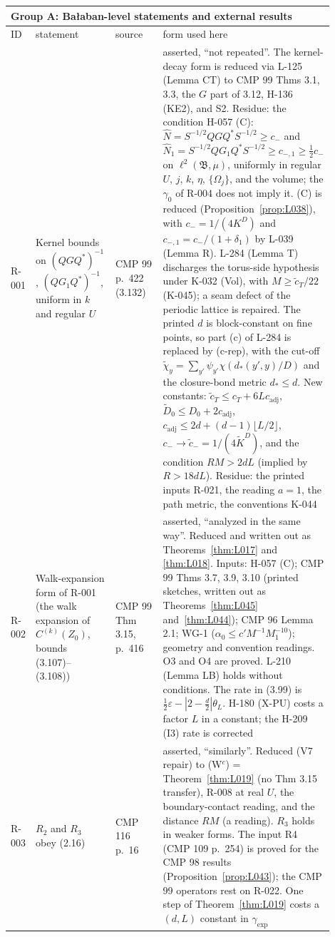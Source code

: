 {\small\tablefiles
\begin{longtable}{p{0.05\linewidth}p{0.33\linewidth}p{0.2\linewidth}p{0.32\linewidth}}
\multicolumn{4}{l}{\textbf{Group A}: Ba{\l}aban-level statements and external results}\\ \hline
ID & statement & source & form used here \\ \hline \endhead
R-001 & Kernel bounds on $(QGQ^*)^{-1}$, $(QG_1Q^*)^{-1}$, uniform in $k$ and regular $U$ & CMP 99 p.\ 422 (3.132) & asserted, ``not repeated''. The kernel-decay form is reduced via L-125 (Lemma CT) to CMP 99 Thms 3.1, 3.3, the $G$ part of 3.12, H-136 (KE2), and S2. Residue: the condition H-057 (C): $\hat N=S^{-1/2}QGQ^*S^{-1/2}\ge c_-$ and $\hat N_1=S^{-1/2}QG_1Q^*S^{-1/2}\ge c_{-,1}\ge\frac12c_-$ on $\ell^2(\mathfrak B,\mu)$, uniformly in regular $U$, $j$, $k$, $\eta$, $\{\Omega_j\}$, and the volume; the $\gamma_0$ of R-004 does not imply it. (C) is reduced (Proposition~\ref{prop:L038}), with $c_-=1/(4K^D)$ and $c_{-,1}=c_-/(1+\delta_1)$ by L-039 (Lemma R). L-284 (Lemma T) discharges the torus-side hypothesis under K-032 (Vol), with $M\ge\tilde c_T/22$ (K-045); a seam defect of the periodic lattice is repaired. The printed $d$ is block-constant on fine points, so part (c) of L-284 is replaced by (c-rep), with the cut-off $\tilde\chi_y=\sum_{y'}\psi_{y'}\chi(d_*(y',y)/D)$ and the closure-bond metric $d_*\le d$. New constants: $\tilde c_T\le c_T+6Lc_{\mathrm{adj}}$, $\tilde D_0\le D_0+2c_{\mathrm{adj}}$, $c_{\mathrm{adj}}\le2d+(d-1)\lfloor L/2\rfloor$, $c_-\to\tilde c_-=1/(4\tilde K^D)$, and the condition $RM>2dL$ (implied by $R>18dL$). Residue: the printed inputs R-021, the reading $a=1$, the path metric, the conventions K-044 \\
R-002 & Walk-expansion form of R-001 (the walk expansion of $C^{(k)}(Z_0)$, bounds (3.107)--(3.108)) & CMP 99 Thm 3.15, p.\ 416 & asserted, ``analyzed in the same way''. Reduced and written out as Theorems~\ref{thm:L017} and \ref{thm:L018}. Inputs: H-057 (C); CMP 99 Thms 3.7, 3.9, 3.10 (printed sketches, written out as Theorems~\ref{thm:L045} and~\ref{thm:L044}); CMP 96 Lemma 2.1; WG-1 ($\alpha_0\le c'M^{-1}M_1^{-10}$); geometry and convention readings. O3 and O4 are proved. L-210 (Lemma LB) holds without conditions. The rate in (3.99) is $\frac12\varepsilon-|2-\frac d2|\theta_L$. H-180 (X-PU) costs a factor $L$ in a constant; the H-209 (I3) rate is corrected \\
R-003 & $R_2$ and $R_3$ obey (2.16) & CMP 116 p.\ 16 & asserted, ``similarly''. Reduced (V7 repair) to (W$^c$) = Theorem~\ref{thm:L019} (no Thm 3.15 transfer), R-008 at real $U$, the boundary-contact reading, and the distance $RM$ (a reading). $R_3$ holds in weaker forms. The input R4 (CMP 109 p.~254) is proved for the CMP 98 results (Proposition~\ref{prop:L043}); the CMP 99 operators rest on R-022. One step of Theorem~\ref{thm:L019} costs a $(d,L)$ constant in $\gamma_{\exp}$ \\

\end{longtable}}
